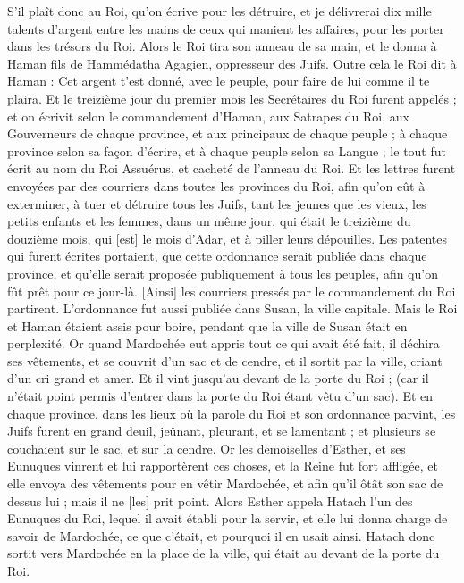 \begin{multicols}{2}
S'il plaît donc au Roi, qu'on écrive pour les détruire, et je délivrerai dix mille talents d'argent entre les mains de ceux qui manient les affaires, pour les porter dans les trésors du Roi.
Alors le Roi tira son anneau de sa main, et le donna à Haman fils de Hammédatha Agagien, oppresseur des Juifs.
Outre cela le Roi dit à Haman : Cet argent t'est donné, avec le peuple, pour faire de lui comme il te plaira.
Et le treizième jour du premier mois les Secrétaires du Roi furent appelés ; et on écrivit selon le commandement d'Haman, aux Satrapes du Roi, aux Gouverneurs de chaque province, et aux principaux de chaque peuple ; à chaque province selon sa façon d'écrire, et à chaque peuple selon sa Langue ; le tout fut écrit au nom du Roi Assuérus, et cacheté de l'anneau du Roi.
Et les lettres furent envoyées par des courriers dans toutes les provinces du Roi, afin qu'on eût à exterminer, à tuer et détruire tous les Juifs, tant les jeunes que les vieux, les petits enfants et les femmes, dans un même jour, qui était le treizième du douzième mois, qui [est] le mois d'Adar, et à piller leurs dépouilles.
Les patentes qui furent écrites portaient, que cette ordonnance serait publiée dans chaque province, et qu'elle serait proposée publiquement à tous les peuples, afin qu'on fût prêt pour ce jour-là.
[Ainsi] les courriers pressés par le commandement du Roi partirent. L'ordonnance fut aussi publiée dans Susan, la ville capitale. Mais le Roi et Haman étaient assis pour boire, pendant que la ville de Susan était en perplexité.
\VerseOne{}Or quand Mardochée eut appris tout ce qui avait été fait, il déchira ses vêtements, et se couvrit d'un sac et de cendre, et il sortit par la ville, criant d'un cri grand et amer.
Et il vint jusqu'au devant de la porte du Roi ; (car il n'était point permis d'entrer dans la porte du Roi étant vêtu d'un sac).
Et en chaque province, dans les lieux où la parole du Roi et son ordonnance parvint, les Juifs furent en grand deuil, jeûnant, pleurant, et se lamentant ; et plusieurs se couchaient sur le sac, et sur la cendre.
Or les demoiselles d'Esther, et ses Eunuques vinrent et lui rapportèrent ces choses, et la Reine fut fort affligée, et elle envoya des vêtements pour en vêtir Mardochée, et afin qu'il ôtât son sac de dessus lui ; mais il ne [les] prit point.
Alors Esther appela Hatach l'un des Eunuques du Roi, lequel il avait établi pour la servir, et elle lui donna charge de savoir de Mardochée, ce que c'était, et pourquoi il en usait ainsi.
Hatach donc sortit vers Mardochée en la place de la ville, qui était au devant de la porte du Roi.

\end{multicols}
